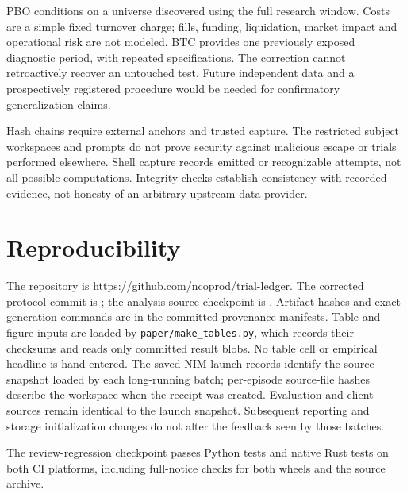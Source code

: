 \documentclass[11pt]{article}
\begin{document}
PBO conditions on a universe discovered using the full research window. Costs
are a simple fixed turnover charge; fills, funding, liquidation, market impact and operational
risk are not modeled. BTC provides one previously exposed diagnostic period,
with repeated specifications. The correction cannot retroactively recover an
untouched test. Future independent data and a prospectively registered procedure
would be needed for confirmatory generalization claims.

Hash chains require external anchors and trusted capture. The restricted subject
workspaces and prompts do not prove security against malicious escape or trials
performed elsewhere. Shell capture records emitted or recognizable attempts,
not all possible computations. Integrity checks establish consistency with
recorded evidence, not honesty of an arbitrary upstream data provider.

\section{Reproducibility}
The repository is \url{https://github.com/ncoprod/trial-ledger}.
The corrected protocol commit is \texttt{\ProtocolCommit}; the analysis source
checkpoint is \texttt{\AnalysisCommit}. Artifact hashes and exact generation
commands are in the committed provenance manifests. Table and figure inputs are
loaded by \texttt{paper/make\_tables.py}, which records their checksums and reads
only committed result blobs. No table cell or empirical headline is hand-entered.
The saved NIM launch records identify the source snapshot loaded by each
long-running batch; per-episode source-file hashes describe the workspace when
the receipt was created. Evaluation and client sources remain identical to the
launch snapshot. Subsequent reporting and storage initialization changes do not
alter the feedback seen by those batches.

The review-regression checkpoint \texttt{\VerifiedCiCommit} passes
\VerifiedTests{} Python tests and \VerifiedRustTests{} native Rust tests on both
CI platforms, including full-notice checks for both wheels and the source archive.
\end{document}
